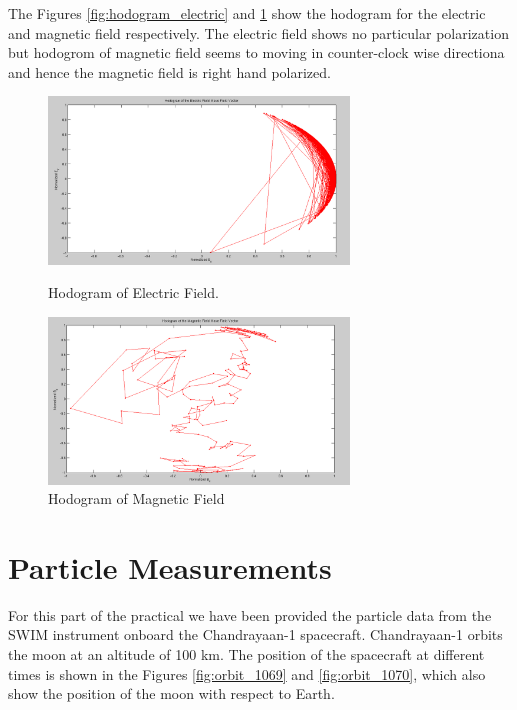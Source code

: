 \documentclass{article}
\begin{document}
The Figures \ref{fig:hodogram_electric} and \ref{fig:hodogram_magnetic} show the hodogram for the electric and magnetic field respectively. The electric field shows no particular polarization but hodogrom of magnetic field seems to moving in counter-clock wise directiona and hence the magnetic field is right hand polarized.

\begin{figure}[hbt!]
\begin{minipage}[c]{0.5\linewidth}
\centering
\includegraphics[width=8cm]{Figures/hodogram_electric.png}
\caption{Hodogram of Electric Field.}
\label{fig:hodogram_electric}
\end{minipage}
\hspace{0.1cm}
\begin{minipage}[c]{0.5\linewidth}
\centering
\includegraphics[width=8cm]{Figures/hodogram_magnetic.png}
\caption{Hodogram of Magnetic Field}
\label{fig:hodogram_magnetic}
\end{minipage}
\end{figure}

\clearpage
\section{Particle Measurements}

For this part of the practical we have been provided the particle data from the SWIM
instrument onboard the Chandrayaan-1 spacecraft. Chandrayaan-1 orbits the moon at an altitude of 100 km. The position of the spacecraft at different times is shown in the Figures \ref{fig:orbit_1069} and \ref{fig:orbit_1070}, which also show the position of the moon with respect to Earth.\cite{Stenberg:2012_2b}
\end{document}
